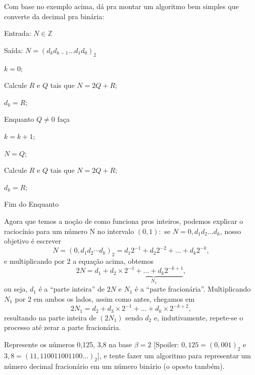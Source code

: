 \documentclass[../numerical_methods.tex]{subfiles}
\begin{document}
Com base no exemplo acima, dá pra montar um algoritmo bem simples que converte da decimal pra binária:
\begin{flushleft}

	Entrada: \(N \in \mathbb{Z}\)

	Saída: \(N = (d_kd_{k-1}\ldots d_1d_0)_2\)

	\vspace{0.4cm}

	\(k = 0;\)

	Calcule \(R\) e \(Q\) tais que \(N = 2Q + R;\)

	\(d_k = R;\)

	\vspace{0.3cm}

	Enquanto \(Q \neq 0\) faça

	\hspace{1cm} \(k = k + 1;\)

	\hspace{1cm} \(N = Q;\)

	\hspace{1cm} Calcule \(R\) e \(Q\) tais que \(N = 2Q + R;\)

	\hspace{1cm} \(d_k = R;\)

	Fim do Enquanto

\end{flushleft}

Agora que temos a noção de como funciona pros inteiros, podemos explicar o raciocínio para um número N no intervalo \((0, 1):\) se \(N=0, d_1d_2 \dotsc d_{k}\), nosso objetivo é escrever
\[
	N = (0, d_1d_2\cdots d_k)_{2} = d_1 2^{-1} + d_2 2^{-2} + \dotsc + d_{k}2^{-k},
\]
e multiplicando por 2 a equação acima, obtemos
\[
	2 N = d_1 + d_2 \times \underbrace{2^{-1} + \dotsc + d_{k} 2^{-k+1}}_{N_1},
\]
ou seja, \(d_1\) é a ``parte inteira'' de \(2N\) e \(N_1\) é a ``parte fracionária''. Multiplicando \(N_1\) por 2 em ambos os lados, assim como antes, chegamos em
\[
	2 N_1 = d_2 + d_3 \times 2^{-1} + \dotsc + d_{k} \times 2^{-k+2},
\]
resultando na parte inteira de \((2 N_1)\) sendo \(d_2\) e, indutivamente, repete-se o processo até zerar a parte fracionária.
\begin{exr}
	Represente os números 0,125, 3,8 na base \(\beta =2\) [Spoiler: \(0,125 = (0,001)_{2}\) e \(3,8 = (11,110011001100 \dotsc )_{2}\)], e tente fazer um algoritmo para representar um número decimal fracionário em um número binário (o oposto também).
\end{exr}
\end{document}
